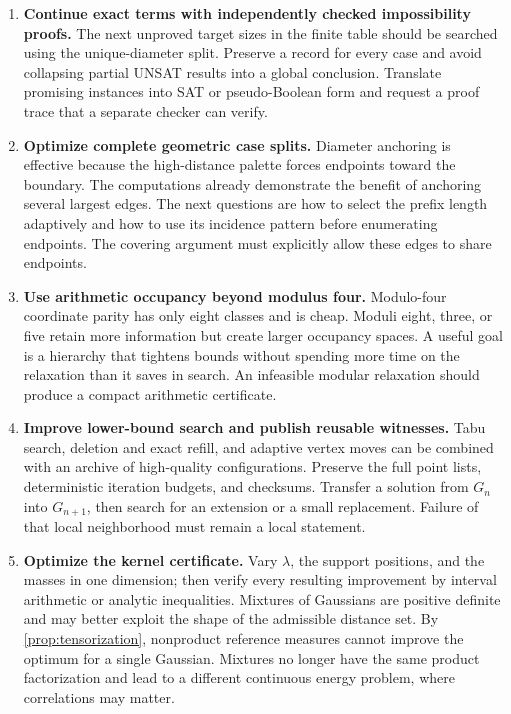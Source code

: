 \documentclass[11pt,letterpaper]{article}
\theoremstyle{definition}
\begin{document}
\begin{enumerate}[label=\textbf{\arabic*.},leftmargin=*]
\item \textbf{Continue exact terms with independently checked
impossibility proofs.}
The next unproved target sizes in the finite table should be searched
using the unique-diameter split. Preserve a record for every case and
avoid collapsing partial UNSAT results into a global conclusion.
Translate promising instances into SAT or pseudo-Boolean form and
request a proof trace that a separate checker can verify.

\item \textbf{Optimize complete geometric case splits.}
Diameter anchoring is effective because the high-distance palette
forces endpoints toward the boundary. The computations already
demonstrate the benefit of anchoring several largest edges. The next
questions are how to select the prefix length adaptively and how to
use its incidence pattern before enumerating endpoints. The covering
argument must explicitly allow these edges to share endpoints.

\item \textbf{Use arithmetic occupancy beyond modulus four.}
Modulo-four coordinate parity has only eight classes and is cheap.
Moduli eight, three, or five retain more information but create larger
occupancy spaces. A useful goal is a hierarchy that tightens bounds
without spending more time on the relaxation than it saves in search.
An infeasible modular relaxation should produce a compact arithmetic
certificate.

\item \textbf{Improve lower-bound search and publish reusable witnesses.}
Tabu search, deletion and exact refill, and adaptive vertex moves can
be combined with an archive of high-quality configurations. Preserve
the full point lists, deterministic iteration budgets, and checksums.
Transfer a solution from \(G_n\) into \(G_{n+1}\), then search for an
extension or a small replacement. Failure of that local neighborhood
must remain a local statement.

\item \textbf{Optimize the kernel certificate.}
Vary \(\lambda\), the support positions, and the masses in one
dimension; then verify every resulting improvement by interval
arithmetic or analytic inequalities. Mixtures of Gaussians are
positive definite and may better exploit the shape of the admissible
distance set. By \cref{prop:tensorization}, nonproduct reference
measures cannot improve the optimum for a single Gaussian. Mixtures
no longer have the same product factorization and lead to a different
continuous energy problem, where correlations may matter.


\end{enumerate}
\end{document}

